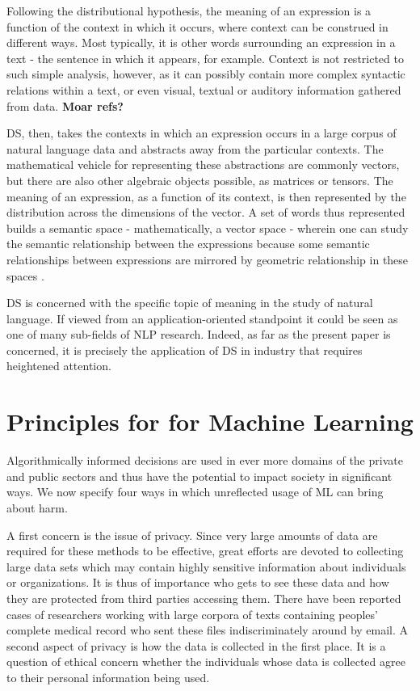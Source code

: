 \documentclass{article}
\begin{document}
Following the distributional hypothesis, the meaning of an expression is a function of the context in which it occurs, where context can be construed in different ways. Most typically, it is other words surrounding an expression in a text - the sentence in which it appears, for example. Context is not restricted to such simple analysis, however, as it can possibly contain more complex syntactic relations within a text, or even visual, textual or auditory information gathered from data. \textbf{Moar refs?}

DS, then, takes the contexts in which an expression occurs in a large corpus of natural language data and abstracts away from the particular contexts. The mathematical vehicle for representing these abstractions are commonly vectors, but there are also other algebraic objects possible, as matrices or tensors. The meaning of an expression, as a function of its context, is then represented by the distribution across the dimensions of the vector. A set of words thus represented builds a semantic space - mathematically, a vector space - wherein one can study the semantic relationship between the expressions because some semantic relationships between expressions are mirrored by geometric relationship in these spaces \cite{boleda2016formal}.

DS is concerned with the specific topic of meaning in the study of natural language. If viewed from an application-oriented standpoint it could be seen as one of many sub-fields of NLP research. Indeed, as far as the present paper is concerned, it is precisely the application of DS in industry that requires heightened attention.


\section{Principles for  for Machine Learning}\hypertarget{sec3}{}
Algorithmically informed decisions are used in ever more domains of the private and public sectors and thus have the potential to impact society in significant ways. We now specify four ways in which unreflected usage of ML can bring about harm.

A first concern is the issue of privacy. Since very large amounts of data are required for these methods to be effective, great efforts are devoted to collecting large data sets which may contain highly sensitive information about individuals or organizations. It is thus of importance who gets to see these data and how they are protected from third parties accessing them. There have been reported cases of researchers working with large corpora of texts containing peoples' complete medical record who sent these files indiscriminately around by email. A second aspect of privacy is how the data is collected in the first place. It is a question of ethical concern whether the individuals whose data is collected agree to their personal information being used.
\end{document}
